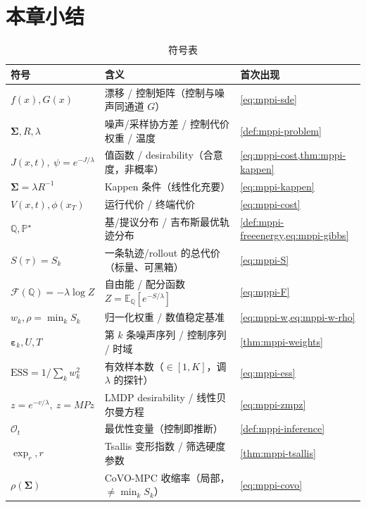 \section*{本章小结}

\begin{table}[H]\centering\small
\caption{符号表}
\begin{tabular}{lll}
\toprule
符号 & 含义 & 首次出现 \\
\midrule
$f(x),G(x)$ & 漂移 / 控制矩阵（控制与噪声同通道 $G$） & \cref{eq:mppi-sde} \\
$\boldsymbol{\Sigma},R,\lambda$ & 噪声/采样协方差 / 控制代价权重 / 温度 & \cref{def:mppi-problem} \\
$J(x,t),\ \psi=e^{-J/\lambda}$ & 值函数 / desirability（合意度，非概率） & \cref{eq:mppi-cost,thm:mppi-kappen} \\
$\boldsymbol{\Sigma}=\lambda R^{-1}$ & Kappen 条件（线性化充要） & \cref{eq:mppi-kappen} \\
$V(x,t),\phi(x_T)$ & 运行代价 / 终端代价 & \cref{eq:mppi-cost} \\
$\mathbb{Q},\mathbb{P}^\star$ & 基/提议分布 / 吉布斯最优轨迹分布 & \cref{def:mppi-freeenergy,eq:mppi-gibbs} \\
$S(\tau)=S_k$ & 一条轨迹/rollout 的总代价（标量、可黑箱） & \cref{eq:mppi-S} \\
$\mathcal{F}(\mathbb{Q})=-\lambda\log Z$ & 自由能 / 配分函数 $Z=\mathbb{E}_{\mathbb{Q}}[e^{-S/\lambda}]$ & \cref{eq:mppi-F} \\
$w_k,\rho=\min_k S_k$ & 归一化权重 / 数值稳定基准 & \cref{eq:mppi-w,eq:mppi-w-rho} \\
$\boldsymbol{\varepsilon}_k,U,T$ & 第 $k$ 条噪声序列 / 控制序列 / 时域 & \cref{thm:mppi-weights} \\
$\mathrm{ESS}=1/\sum_k w_k^2$ & 有效样本数（$\in[1,K]$，调 $\lambda$ 的探针） & \cref{eq:mppi-ess} \\
$z=e^{-v/\lambda},\ z=MPz$ & LMDP desirability / 线性贝尔曼方程 & \cref{eq:mppi-zmpz} \\
$\mathcal{O}_t$ & 最优性变量（控制即推断） & \cref{def:mppi-inference} \\
$\exp_r,r$ & Tsallis 变形指数 / 筛选硬度参数 & \cref{thm:mppi-tsallis} \\
$\rho(\boldsymbol{\Sigma})$ & CoVO-MPC 收缩率（局部，$\ne\min_k S_k$） & \cref{eq:mppi-covo} \\
\bottomrule
\end{tabular}
\end{table}

